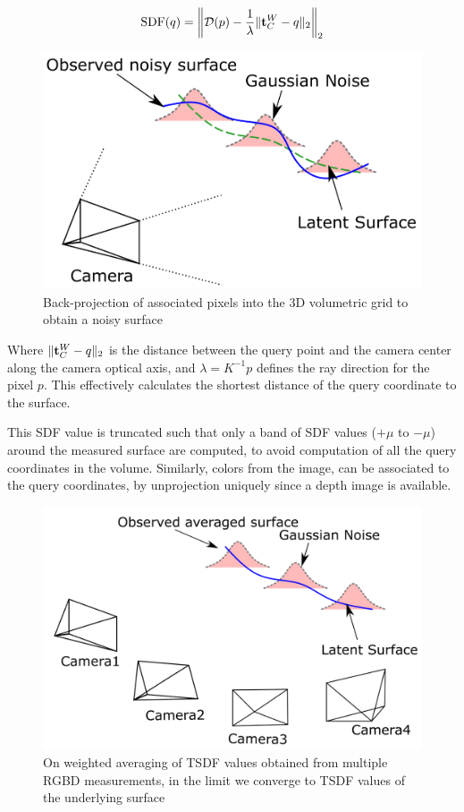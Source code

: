 \begin{align}
    \text{SDF}(q) =  \left\lVert \mathcal{D}(p) - \frac{1}{\lambda} \|\mathbf{t}_C^W - q\|_2 \right\rVert_2
\end{align}

\begin{figure}[htpb]
    \centering
    \includegraphics[width=0.6\linewidth]{figs/tsdf-single-image.png}
    \caption{Back-projection of associated pixels into the 3D volumetric grid to obtain a noisy surface}%
    \label{fig:figs/tsdf-single-image}
\end{figure}

 Where $\| \mathbf{t}_C^W - q \|_2$ is the distance between the query point and the camera center along the camera optical axis, and $\lambda = K^{-1} p$ defines the ray direction for the pixel $p$. This effectively calculates the shortest distance of the query coordinate to the surface.

This SDF value is truncated such that only a band of SDF values ($+\mu$ to $-\mu$) around the measured surface are computed, to avoid computation of all the query coordinates in the volume.
Similarly, colors from the image, can be associated to the query coordinates, by unprojection uniquely since a depth image is available.

\begin{figure}[htpb]
    \centering
    \includegraphics[width=0.5\linewidth]{figs/tsdf-multiple-images.png}
    \caption{On weighted averaging of TSDF values obtained from multiple RGBD measurements, in the limit we converge to TSDF values of the underlying surface}%
    \label{fig:tsdf-multiple-images}
\end{figure}

